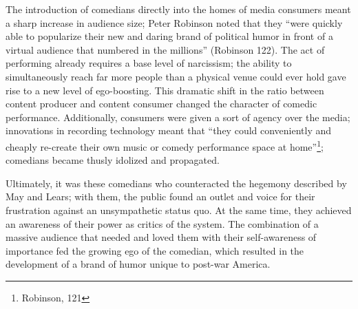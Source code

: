 The introduction of comedians directly into the homes of media consumers meant a
sharp increase in audience size; Peter Robinson noted that they ``were quickly
able to popularize their new and daring brand of political humor in front of a
virtual audience that numbered in the millions'' (Robinson 122). The act of
performing already requires a base level of narcissism; the ability to
simultaneously reach far more people than a physical venue could ever hold gave
rise to a new level of ego-boosting. This dramatic shift in the ratio between
content producer and content consumer changed the character of comedic
performance. Additionally, consumers were given a sort of agency over the media;
innovations in recording technology meant that ``they could conveniently and
cheaply re-create their own music or comedy performance space at
home''\footnote{Robinson, 121}; comedians became thusly idolized and propagated.

Ultimately, it was these comedians who counteracted the hegemony described by
May and Lears; with them, the public found an outlet and voice for their
frustration against an unsympathetic status quo. At the same time, they achieved
an awareness of their power as critics of the system. The combination of a
massive audience that needed and loved them with their self-awareness of
importance fed the growing ego of the comedian, which resulted in the
development of a brand of humor unique to post-war America.
